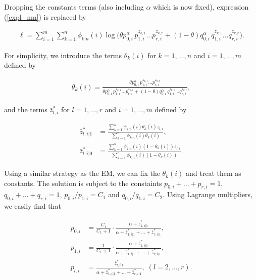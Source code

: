 \documentclass[12pt]{article}
\begin{document}
\begin{appendices}
    Dropping the constants terms (also including $\alpha$ which is
    now fixed), expression (\ref{expl_nm}) is replaced by

    \begin{align*}
    \ell = \sum_{i=1}^m\sum_{k=1}^n \phi_{k|n}(i)
      \log\Big(\theta p_{0,i}^{\alpha} \, p_{1,i}^{z_{k,1}} \ldots
      p_{r,i}^{z_{k,r}} +
      (1-\theta) q_{0,i}^{\alpha} \, q_{1,i}^{z_{k,1}} \ldots
      q_{r,i}^{z_{k,r}} \Big).
    \end{align*}

    For simplicity, we introduce the terms $\theta_k(i)$ for
    $k = 1, \ldots, n$ and $i = 1, \ldots, m$ defined by

    \begin{align}
    \theta_k(i) = \frac{\theta p_{0,i}^{\alpha} \, p_{1,i}^{z_{k,1}}
    \ldots p_{r,i}^{z_{k,r}}}
    {\theta p_{0,i}^{\alpha} \, p_{1,i}^{z_{k,1}}
    \ldots p_{r,i}^{z_{k,r}} + (1-\theta) q_{0,i}^{\alpha} \,
    q_{1,i}^{z_{k,1}} \ldots q_{r,i}^{z_{k,r}}},
\label{thetaki}
    \end{align}

\noindent
    and the terms $\bar{z}_{l,i}^*$ for $l = 1, \ldots, r$ and
    $i = 1, \ldots, m$ defined by

    \begin{align*}
    \bar{z}_{l,i|1}^* &= \frac{\sum_{k=1}^n\phi_{k|n}(i)
      \theta_k(i)z_{l,i}}{\sum_{k=1}^n\phi_{k|n}(i)\theta_k(i)}, \\
    \bar{z}_{l,i|0}^* &= \frac{\sum_{k=1}^n\phi_{k|n}(i)
      (1-\theta_k(i))z_{l,i}}{\sum_{k=1}^n\phi_{k|n}(i)(1-\theta_k(i))}.
    \end{align*}

    Using a similar strategy as the EM, we can fix the $\theta_k(i)$
    and treat them as constants. The solution is subject to the
    constaints $p_{0,i}+\ldots+p_{r,i} = 1$,
    $q_{0,i}+\ldots+q_{r,i} = 1$, $p_{0,i}/p_{1,i} = C_1$ and
    $q_{0,i}/q_{1,i} = C_2$. Using Lagrange multipliers, we easily
    find that

    \begin{align*}
    p_{0,i} &= \frac{C_1}{C_1+1} \cdot \frac{\alpha+\bar{z}_{1,i|1}^*}
      {\alpha + \bar{z}_{1,i|1}^* +
      \ldots + \bar{z}_{r,i|1}^*}, \\
    p_{1,i} &= \frac{1}{C_1+1} \cdot \frac{\alpha+\bar{z}_{1,i|1}^*}
      {\alpha + \bar{z}_{1,i|1}^* +
      \ldots + \bar{z}_{r,i|1}^*}, \\
    p_{l,i} &= \frac{\bar{z}_{l,i|1}^*}{\alpha + \bar{z}_{1,i|1}^* +
      \ldots + \bar{z}_{r,i|1}^*}, \; (l = 2, \ldots, r).
    \end{align*}


\end{appendices}
\end{document}
